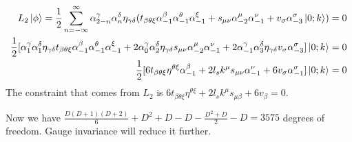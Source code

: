 \documentclass[12pt]{article}
\begin{document}
\begin{equation}
\begin{aligned}[t]
L_2\ket{\phi}=\frac{1}{2}\sum\limits_{n=-\infty}^\infty \alpha_{2-n}^\gamma\alpha_n^\delta\eta_{\gamma\delta}(t_{\beta\theta\xi}\alpha_{-1}^\beta\alpha_{-1}^\theta\alpha_{-1}^\xi+s_{\mu\nu}\alpha_{-2}^\mu\alpha_{-1}^\nu+v_\sigma\alpha_{-3}^\sigma\ket{0;k})=0\\
\frac{1}{2}[\alpha_{1}^\gamma\alpha_1^\delta\eta_{\gamma\delta}t_{\beta\theta\xi}\alpha_{-1}^\beta\alpha_{-1}^\theta\alpha_{-1}^\xi+2\alpha_{0}^\gamma\alpha_2^\delta\eta_{\gamma\delta}s_{\mu\nu}\alpha_{-2}^\mu\alpha_{-1}^\nu+2\alpha_{-1}^\gamma\alpha_3^\delta\eta_{\gamma\delta}v_\sigma\alpha_{-3}^\sigma]\ket{0;k}=0\\
\frac{1}{2}[6t_{\beta\theta\xi}\eta^{\theta\xi}\alpha_{-1}^\beta+2l_s k^\mu s_{\mu\nu}\alpha_{-1}^\nu+6v_\sigma\alpha_{-1}^\sigma]\ket{0;k}=0
\end{aligned}
\end{equation}
The constraint that comes from $L_2$ is $6t_{\beta\theta\xi}\eta^{\theta\xi}+2l_s k^\mu s_{\mu\beta}+6v_\beta=0$.

Now we have $\frac{D(D+1)(D+2)}{6}+D^2+D-D-\frac{D^2+D}{2}-D=3575$ degrees of freedom. Gauge invariance will reduce it further.\\
\end{document}
